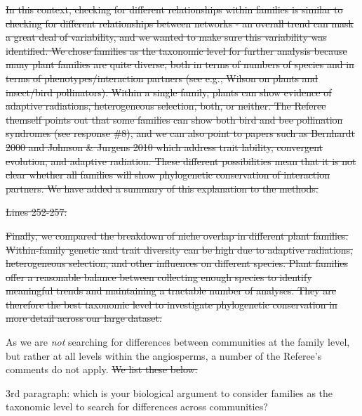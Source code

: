 \documentclass[12pt]{letter}
\newenvironment{refquote}{\bigskip \begin{it}}{\end{it}\smallskip}
\providecommand{\DIFadd}[1]{{\protect\color{blue}\uwave{#1}}} %
\providecommand{\DIFdel}[1]{{\protect\color{red}\sout{#1}}}                      %
\providecommand{\DIFaddbegin}{} %
\providecommand{\DIFaddend}{} %
\providecommand{\DIFdelbegin}{} %
\providecommand{\DIFdelend}{} %
\newcommand{\DIFscaledelfig}{0.5}
\newlength{\DIFdelgraphicswidth} %
\newlength{\DIFdelgraphicsheight} %
\newcommand{\DIFaddincludegraphics}[2][]{{\color{blue}\fbox{\DIFOincludegraphics[#1]{#2}}}} %
\newcommand{\DIFdelincludegraphics}[2][]{%
\sbox{\DIFdelgraphicsbox}{\DIFOincludegraphics[#1]{#2}}%
\settoboxwidth{\DIFdelgraphicswidth}{\DIFdelgraphicsbox} %
\settoboxtotalheight{\DIFdelgraphicsheight}{\DIFdelgraphicsbox} %
\scalebox{\DIFscaledelfig}{%
\parbox[b]{\DIFdelgraphicswidth}{\usebox{\DIFdelgraphicsbox}\\[-\baselineskip] \rule{\DIFdelgraphicswidth}{0em}}\llap{\resizebox{\DIFdelgraphicswidth}{\DIFdelgraphicsheight}{%
\setlength{\unitlength}{\DIFdelgraphicswidth}%
\begin{picture}(1,1)%
\thicklines\linethickness{2pt} %
{\color[rgb]{1,0,0}\put(0,0){\framebox(1,1){}}}%
{\color[rgb]{1,0,0}\put(0,0){\line( 1,1){1}}}%
{\color[rgb]{1,0,0}\put(0,1){\line(1,-1){1}}}%
\end{picture}%
}\hspace*{3pt}}} %
} %
\DeclareRobustCommand{\DIFaddbegin}{\DIFOaddbegin \let\includegraphics\DIFaddincludegraphics} %
\DeclareRobustCommand{\DIFaddend}{\DIFOaddend \let\includegraphics\DIFOincludegraphics} %
\DeclareRobustCommand{\DIFdelbegin}{\DIFOdelbegin \let\includegraphics\DIFdelincludegraphics} %
\DeclareRobustCommand{\DIFdelend}{\DIFOaddend \let\includegraphics\DIFOincludegraphics} %
\begin{document}
		\DIFdelbegin \DIFdel{In this context, checking for different relationships within families is similar to checking for different relationships between networks - an overall trend can mask a great deal of variability, and we wanted to make sure this variability was identified. We chose families as the taxonomic level for further analysis because many plant families are quite diverse, both in terms of numbers of species and in terms of phenotypes/interaction partners (see e.g., Wilson on plants and insect/bird pollinators). Within a single family, plants can show evidence of adaptive radiations, heterogeneous selection, both, or neither. The Referee themself points out that some families can show both bird and bee pollination syndromes (see response \#8), and we can also point to papers such as Bernhardt 2000 and Johnson \& Jurgens 2010 which address trait lability, convergent evolution, and adaptive radiation. These different possibilities mean that it is not clear whether all families will show phylogenetic conservation of interaction partners. 
		We have added a summary of this explanation to the methods. 
}%

\DIFdel{Lines 252-257:
}%


\DIFdel{Finally, we compared the breakdown of niche overlap in different plant families.
		    Within-family genetic and trait diversity can be high due to adaptive radiations, heterogeneous selection, and other influences on different species. 
		    Plant families offer a reasonable balance between collecting enough species to identify meaningful trends and maintaining a tractable number of analyses. 
		    They are therefore the best taxonomic level to investigate phylogenetic conservation in more detail across our large dataset.
}%


\DIFdelend As we are \emph{not} searching for differences between communities at the family level, but rather at all levels within the angiosperms, a number of the Referee's comments do not apply. \DIFdelbegin \DIFdel{We list these below. 
}\DIFdelend \DIFaddbegin \DIFadd{For example, the comments below:
}\DIFaddend 


		\begin{refquote}
		3rd paragraph:  which is your biological argument to consider families as the taxonomic level to search for differences across communities?
		\end{refquote}
\end{document}
